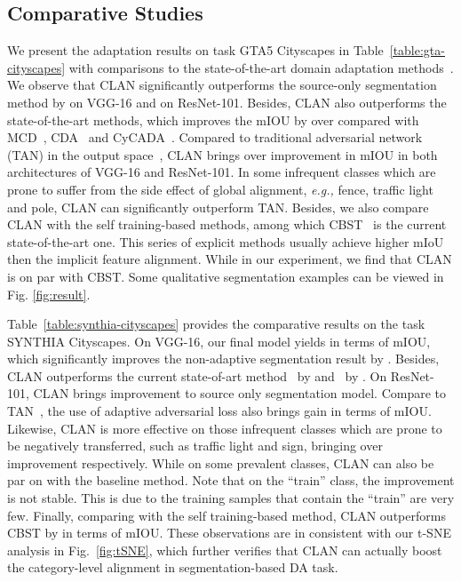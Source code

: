 \documentclass[10pt,twocolumn,letterpaper]{article}
\begin{document}
\subsection{Comparative Studies}
We present the adaptation results on task GTA5  Cityscapes in Table~\ref{table:gta-cityscapes} with comparisons to the state-of-the-art domain adaptation methods~\cite{saito2017maximum,zhang2017curriculum,hoffman2016fcns,hoffman2017cycada,tsai2018OutputSpace,zou2018unsupervised}. We observe that CLAN significantly outperforms the source-only segmentation method by  on VGG-16 and  on ResNet-101. Besides, CLAN also outperforms the state-of-the-art methods, which improves the mIOU by over  compared with MCD~\cite{saito2017maximum}, CDA~\cite{zhang2017curriculum} and CyCADA~\cite{hoffman2017cycada}. Compared to traditional adversarial network (TAN) in the output space~\cite{tsai2018OutputSpace}, CLAN brings over  improvement in mIOU in both architectures of VGG-16 and ResNet-101. In some infrequent classes which are prone to suffer from the side effect of global alignment, \emph{e.g.,} fence, traffic light and pole, CLAN can significantly outperform TAN. Besides, we also compare CLAN with the self training-based methods, among which CBST~\cite{zou2018unsupervised} is the current state-of-the-art one. This series of explicit methods usually achieve higher mIoU then the implicit feature alignment. While in our experiment, we find that CLAN is on par with CBST. Some qualitative segmentation examples can be viewed in Fig. \ref{fig:result}.

Table~\ref{table:synthia-cityscapes} provides the comparative results on the task SYNTHIA  Cityscapes. On VGG-16, our final model yields  in terms of mIOU, which significantly improves the non-adaptive segmentation result by . Besides, CLAN outperforms the current state-of-art method~\cite{hoffman2016fcns} by  and~\cite{chen2017cross} by . On ResNet-101, CLAN brings  improvement to source only segmentation model. Compare to TAN~\cite{tsai2018OutputSpace}, the use of adaptive adversarial loss also brings  gain in terms of mIOU. Likewise, CLAN is more effective on those infrequent classes which are prone to be negatively transferred, such as traffic light and sign, bringing over  improvement respectively. While on some prevalent classes, CLAN can also be par on with the baseline method. Note that on the ``train'' class, the improvement is not stable. This is due to the training samples that contain the ``train'' are very few. Finally, comparing with the self training-based method, CLAN outperforms CBST by  in terms of mIOU. These observations are in consistent with our t-SNE analysis in Fig.~\ref{fig:tSNE}, which further verifies that CLAN can actually boost the category-level alignment in segmentation-based DA task.
\end{document}

